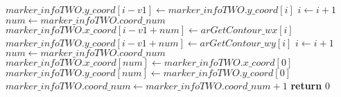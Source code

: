 \begin{algorithm}[!ht]
\begin{algorithmic}[1]
		\State $\mathit{marker\_infoTWO.y\_coord}\left[i - \mathit{v1}\right] \gets
		 \mathit{marker\_infoTWO.y\_coord}\left[i\right]$
		\State $i \gets i + 1$
	\EndFor
	\label{alg:argetcontour-3-dividecoordnum-end}
	\label{alg:argetcontour-3-merge-start}
		\State $num \gets \mathit{marker\_infoTWO.coord\_num}$
		\State $\mathit{marker\_infoTWO.x\_coord}\left[i - \mathit{v1} + num\right] \gets
		 \mathit{arGetContour\_wx}[i]$
		\State $\mathit{marker\_infoTWO.y\_coord}\left[i - \mathit{v1} + num\right] \gets
		 \mathit{arGetContour\_wy}[i]$
		\State $i \gets i + 1$
	\EndFor
	\label{alg:argetcontour-3-merge-end}
	\State $num \gets \mathit{marker\_infoTWO.coord\_num}$
	\label{alg:argetcontour-3-savev1-start}
	\State $\mathit{marker\_infoTWO.x\_coord}[num] \gets \mathit{marker\_infoTWO.x\_coord}[0]$
	\State $\mathit{marker\_infoTWO.y\_coord}[num] \gets \mathit{marker\_infoTWO.y\_coord}[0]$
	\label{alg:argetcontour-3-savev1-end}
	\State $\mathit{marker\_infoTWO.coord\_num} \gets \mathit{marker\_infoTWO.coord\_num} + 1$
	\label{alg:argetcontour-3-inccoordnum}
	\State \textbf{return} $0$
\end{algorithmic}
\end{algorithm}
